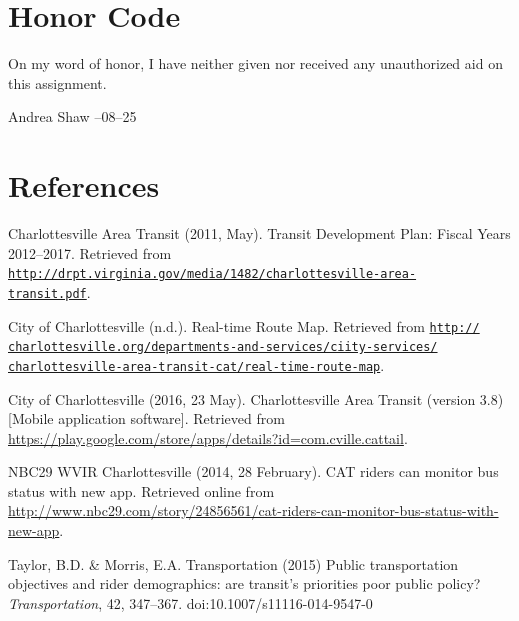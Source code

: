 \documentclass[12pt,letterpaper]{article}
\begin{document}
\section{Honor Code}
On my word of honor, I have neither given nor received any unauthorized aid on this assignment.
\begin{center}
    Andrea Shaw\qquad {\hrulefill} --08--25
\end{center}

\section{References}
Charlottesville Area Transit (2011, May). Transit Development Plan: Fiscal Years 2012--2017. Retrieved from \href{http://drpt.virginia.gov/media/1482/charlottesville-area-transit.pdf}{\tt http://drpt.virginia.gov/media/1482/charlottesville-area- \\
transit.pdf}.

City of Charlottesville (n.d.). Real-time Route Map. Retrieved from \href{http://www.charlottesville.org/departments-and-services/city-services/charlottesville-area-transit-cat/real-time-route-map}{\tt http:// \\
charlottesville.org/departments-and-services/ciity-services/ \\
charlottesville-area-transit-cat/real-time-route-map}.

City of Charlottesville (2016, 23 May). Charlottesville Area Transit (version 3.8) [Mobile application software]. Retrieved from \url{https://play.google.com/store/apps/details?id=com.cville.cattail}.

NBC29 WVIR Charlottesville (2014, 28 February). CAT riders can monitor bus status with new app. Retrieved online from \url{http://www.nbc29.com/story/24856561/cat-riders-can-monitor-bus-status-with-new-app}.

Taylor, B.D. \& Morris, E.A. Transportation (2015) Public transportation objectives and rider demographics:
are transit’s priorities poor public policy? \emph{Transportation}, 42, 347--367. doi:10.1007/s11116-014-9547-0
\end{document}
